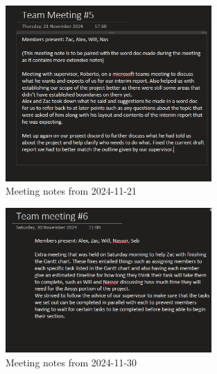             \begin{figure}[htbp]
                \centering
                \includegraphics[width=0.7\textwidth]{figures/Appendix-MeetingNotes/meeting_note_5.png}
                \caption*{Meeting notes from 2024-11-21} 
                \label{fig:meeting5}
                \end{figure}

                
                \begin{figure}[htbp]
                    \centering
                    \includegraphics[width=0.7\textwidth]{figures/Appendix-MeetingNotes/meeting_note_6.png}
                    \caption*{Meeting notes from 2024-11-30} 
                    \label{fig:meeting6}
                    \end{figure}

